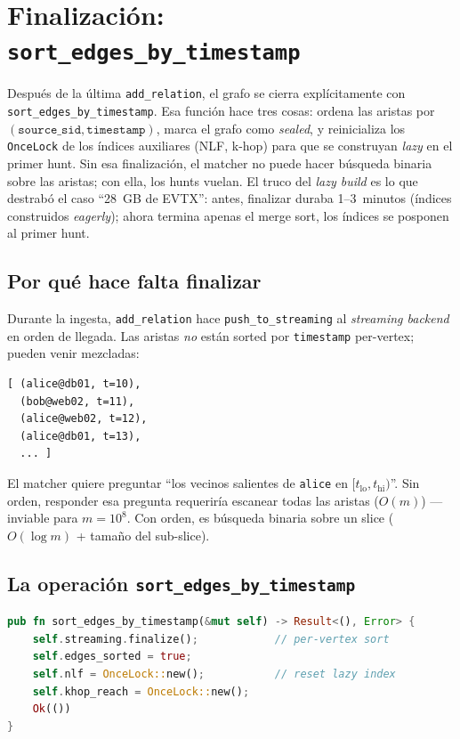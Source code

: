 \chapter{Finalización: \texttt{sort\_edges\_by\_timestamp}}
\label{cap:finalize}

\begin{intuicion}
Después de la última \texttt{add\_relation}, el grafo se cierra
explícitamente con \texttt{sort\_edges\_by\_timestamp}. Esa función
hace tres cosas: ordena las aristas por
\((\texttt{source\_sid}, \texttt{timestamp})\), marca el grafo como
\emph{sealed}, y reinicializa los \texttt{OnceLock} de los índices
auxiliares (NLF, k-hop) para que se construyan \emph{lazy} en el
primer hunt. Sin esa finalización, el matcher no puede hacer
búsqueda binaria sobre las aristas; con ella, los hunts vuelan. El
truco del \emph{lazy build} es lo que destrabó el caso ``28~GB de
EVTX'': antes, finalizar duraba 1--3~minutos (índices construidos
\emph{eagerly}); ahora termina apenas el merge sort, los índices se
posponen al primer hunt.
\end{intuicion}

\section{Por qué hace falta finalizar}

Durante la ingesta, \texttt{add\_relation} hace \texttt{push\_to\_streaming}
al \emph{streaming backend} en orden de llegada. Las aristas
\emph{no} están sorted por \texttt{timestamp} per-vertex; pueden venir
mezcladas:

\begin{lstlisting}
[ (alice@db01, t=10),
  (bob@web02, t=11),
  (alice@web02, t=12),
  (alice@db01, t=13),
  ... ]
\end{lstlisting}

\noindent
El matcher quiere preguntar ``los vecinos salientes de \texttt{alice}
en \([t_{\mathrm{lo}}, t_{\mathrm{hi}})\)''. Sin orden,
responder esa pregunta requeriría escanear todas las aristas
($O(m)$) ---inviable para $m = 10^8$. Con orden, es búsqueda
binaria sobre un slice ($O(\log m)$ + tamaño del sub-slice).

\section{La operación \texttt{sort\_edges\_by\_timestamp}}

\begin{lstlisting}[language=Rust]
pub fn sort_edges_by_timestamp(&mut self) -> Result<(), Error> {
    self.streaming.finalize();            // per-vertex sort
    self.edges_sorted = true;
    self.nlf = OnceLock::new();           // reset lazy index
    self.khop_reach = OnceLock::new();
    Ok(())
}
\end{lstlisting}


